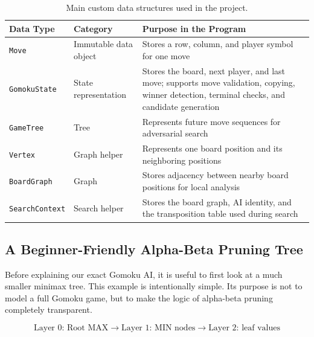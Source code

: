 \documentclass[11pt]{article}
\begin{document}
\begin{table}[H]
\centering
\small
\begin{tabularx}{\textwidth}{|P{3.0cm}|P{2.1cm}|Y|}
\hline
\textbf{Data Type} & \textbf{Category} & \textbf{Purpose in the Program} \\
\hline
\texttt{Move} & Immutable data object & Stores a row, column, and player symbol for one move \\
\hline
\texttt{GomokuState} & State representation & Stores the board, next player, and last move; supports move validation, copying, winner detection, terminal checks, and candidate generation \\
\hline
\texttt{GameTree} & Tree & Represents future move sequences for adversarial search \\
\hline
\texttt{Vertex} & Graph helper & Represents one board position and its neighboring positions \\
\hline
\texttt{BoardGraph} & Graph & Stores adjacency between nearby board positions for local analysis \\
\hline
\texttt{SearchContext} & Search helper & Stores the board graph, AI identity, and the transposition table used during search \\
\hline
\end{tabularx}
\caption{Main custom data structures used in the project.}
\end{table}

\subsection*{A Beginner-Friendly Alpha-Beta Pruning Tree}

Before explaining our exact Gomoku AI, it is useful to first look at a much smaller minimax tree. This example is intentionally simple. Its purpose is not to model a full Gomoku game, but to make the logic of alpha-beta pruning completely transparent.

\[
\text{Layer 0: Root MAX}
\rightarrow
\text{Layer 1: MIN nodes}
\rightarrow
\text{Layer 2: leaf values}
\]
\end{document}
